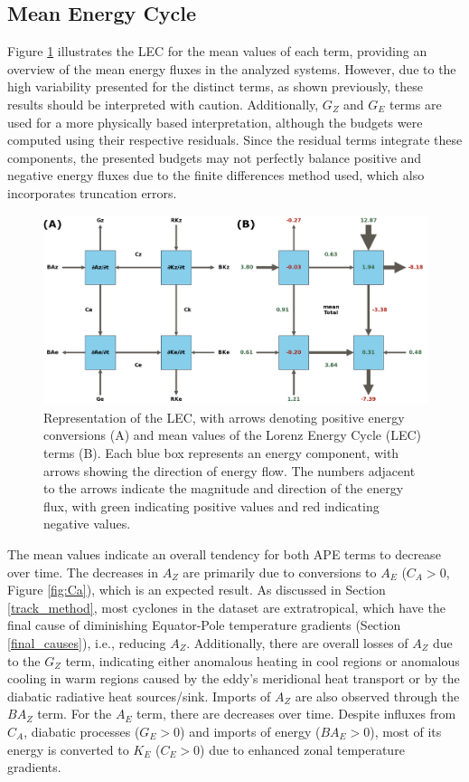 \subsection{Mean Energy Cycle}\label{sec:lec_mean}

Figure \ref{fig:lec_mean_values} illustrates the LEC for the mean values of each term, providing an overview of the mean energy fluxes in the analyzed systems. However, due to the high variability presented for the distinct terms, as shown previously, these results should be interpreted with caution. Additionally, $G_Z$ and $G_E$ terms are used for a more physically based interpretation, although the budgets were computed using their respective residuals. Since the residual terms integrate these components, the presented budgets may not perfectly balance positive and negative energy fluxes due to the finite differences method used, which also incorporates truncation errors.

\begin{figure}[!htbp]
\centering
\includegraphics[width=\textwidth]{figs_5/lec_mean_values.pdf}
\caption[LEC - Mean Life Cycle]{Representation of the LEC, with arrows denoting positive energy conversions (A) and mean values of the Lorenz Energy Cycle (LEC) terms (B). Each blue box represents an energy component, with arrows showing the direction of energy flow. The numbers adjacent to the arrows indicate the magnitude and direction of the energy flux, with green indicating positive values and red indicating negative values.}
\label{fig:lec_mean_values}
\end{figure}

The mean values indicate an overall tendency for both APE terms to decrease over time. The decreases in $A_Z$ are primarily due to conversions to $A_E$ ($C_A > 0$, Figure \ref{fig:Ca}), which is an expected result. As discussed in Section \ref{track_method}, most cyclones in the dataset are extratropical, which have the final cause of diminishing Equator-Pole temperature gradients (Section \ref{final_causes}), i.e., reducing $A_Z$. Additionally, there are overall losses of $A_Z$ due to the $G_Z$ term, indicating either anomalous heating in cool regions or anomalous cooling in warm regions caused by the eddy's meridional heat transport or by the diabatic radiative heat sources/sink. Imports of $A_Z$ are also observed through the $BA_Z$ term. For the $A_E$ term, there are decreases over time. Despite influxes from $C_A$, diabatic processes ($G_E > 0$) and imports of energy ($BA_E > 0$), most of its energy is converted to $K_E$ ($C_E > 0$) due to enhanced zonal temperature gradients.

